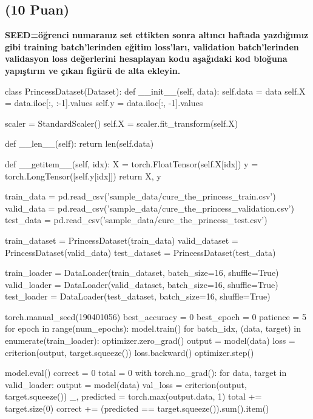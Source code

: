 \documentclass[11pt]{article}
\begin{document}
\subsection{(10 Puan)} \textbf{SEED=öğrenci numaranız set ettikten sonra altıncı haftada yazdığımız gibi training batch'lerinden eğitim loss'ları, validation batch'lerinden validasyon loss değerlerini hesaplayan kodu aşağıdaki kod bloğuna yapıştırın ve çıkan figürü de alta ekleyin.}

\begin{python}
class PrincessDataset(Dataset):
    def __init__(self, data):
        self.data = data
        self.X = data.iloc[:, :-1].values
        self.y = data.iloc[:, -1].values

        scaler = StandardScaler()
        self.X = scaler.fit_transform(self.X)

    def __len__(self):
        return len(self.data)

    def __getitem__(self, idx):
        X = torch.FloatTensor(self.X[idx])
        y = torch.LongTensor([self.y[idx]])
        return X, y


train_data = pd.read_csv('sample_data/cure_the_princess_train.csv')
valid_data = pd.read_csv('sample_data/cure_the_princess_validation.csv')
test_data = pd.read_csv('sample_data/cure_the_princess_test.csv')


train_dataset = PrincessDataset(train_data)
valid_dataset = PrincessDataset(valid_data)
test_dataset = PrincessDataset(test_data)

train_loader = DataLoader(train_dataset, batch_size=16, shuffle=True)
valid_loader = DataLoader(valid_dataset, batch_size=16, shuffle=True)
test_loader = DataLoader(test_dataset, batch_size=16, shuffle=True)

torch.manual_seed(190401056)
best_accuracy = 0
best_epoch = 0
patience = 5
for epoch in range(num_epochs):
    model.train()
    for batch_idx, (data, target) in enumerate(train_loader):
        optimizer.zero_grad()
        output = model(data)
        loss = criterion(output, target.squeeze())
        loss.backward()
        optimizer.step()


    model.eval()
    correct = 0
    total = 0
    with torch.no_grad():
        for data, target in valid_loader:
            output = model(data)
            val_loss = criterion(output, target.squeeze())
            _, predicted = torch.max(output.data, 1)
            total += target.size(0)
            correct += (predicted == target.squeeze()).sum().item()
    

\end{python}
\end{document}
